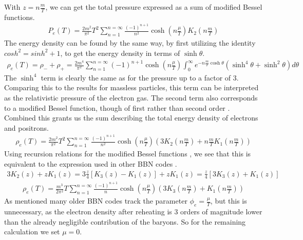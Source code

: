 With $z=n\frac{m }{T}$, we can get the total pressure expressed as a sum of modified Bessel functions.
\begin{align}
    P_e(T)=\frac{2m^2}{\pi^2} T^2 \sum_{n=1}^{n=\infty} \frac{(-1)^{n+1}}{n^{2}} \cosh{\left(n\frac{\mu}{T}\right)}   K_2\left(n\frac{m }{T}\right)
    \label{Pelectron}
\end{align}
The energy density can be found by the same way, by first utilizing the identity $cosh^2=sinh^2+1$, to get the energy density in terms of $\sinh\theta$.
\begin{align}
    \rho_e(T)=\rho_-+\rho_+=\frac{2m^4}{\pi^2}\sum_{n=1}^{n=\infty} (-1)^{n+1} \cosh{\left(n\frac{\mu}{T}\right)}  \int_{0}^{\infty}e^{-n\frac{m }{T}\cosh\theta}\left(\sinh^4\theta +\sinh^2\theta\right) d\theta
\end{align}
The $\sinh^4$ term is clearly the same as for the pressure up to a factor of 3. Comparing this to the results for massless particles, this term can be interpreted as the relativistic pressure of the electron gas. The second term also corresponds to a modified Bessel function, though of first rather than second order \cite[\href{https://dlmf.nist.gov/10.32.E8}{(10.32.8)}]{NIST:DLMF}. Combined this grants us the sum describing the total energy density of electrons and positrons.
\begin{align}
    \rho_e(T)=\frac{2m^2}{\pi^2} T^2 \sum_{n=1}^{n=\infty} \frac{(-1)^{n+1}}{n^{2}} \cosh{\left(n\frac{\mu}{T}\right)}  \left( 3 K_2\left(n\frac{m }{T}\right) + n\frac{m }{T} K_1\left(n\frac{m }{T}\right) \right)
    \label{rhoelectron}
\end{align}
Using recursion relations for the modified Bessel functions \cite[\href{https://dlmf.nist.gov/10.29.E1}{(10.29.1)}]{NIST:DLMF}, we see that this is equivalent to the expression used in other BBN codes \cite{Kawano}.
\begin{align}
3K_{2}(z)+z K_{1}(z)=3\frac{z}{4}[K_{3}(z)-K_{1}(z)]+z K_{1}(z)=\frac{z}{4}[3K_{3}(z)+K_{1}(z)]
\end{align}
\begin{align}
    \rho_e(T)=\frac{m^3}{2\pi^2} T \sum_{n=1}^{n=\infty} \frac{(-1)^{n+1}}{n} \cosh{\left(n\frac{\mu}{T}\right)}  \left( 3 K_3\left(n\frac{m }{T}\right) + K_1\left(n\frac{m }{T}\right) \right)
\end{align}
As mentioned many older BBN codes track the parameter $\phi_e=\frac{\mu}{T}$, but this is unnecessary, as the electron density after reheating is 3 orders of magnitude lower than the already negligible contribution of the baryons. So for the remaining calculation we set $\mu = 0$.

